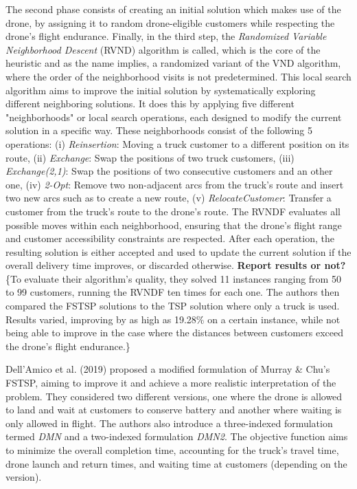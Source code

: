 \documentclass{article}
\begin{document}
	 The second phase consists of creating an initial solution which makes use of the drone, by assigning it to random drone-eligible customers while respecting the drone's flight endurance. Finally, in the third step, the \textit{Randomized Variable Neighborhood Descent} (RVND) algorithm is called, which is the core of the heuristic and as the name implies, a randomized variant of the VND algorithm, where the order of the neighborhood visits is not predetermined. This local search algorithm aims to improve the initial solution by systematically exploring different neighboring solutions. It does this by applying five different "neighborhoods" or local search operations, each designed to modify the current solution in a specific way. These neighborhoods consist of the following 5 operations: (i) \textit{Reinsertion}: Moving a truck customer to a different position on its route, (ii) \textit{Exchange}: Swap the positions of two truck customers, (iii) \textit{Exchange(2,1)}: Swap the positions of two consecutive customers and  an other one, (iv) \textit{2-Opt}: Remove two non-adjacent arcs from the truck's route and insert two new arcs such as to create a new route, (v) \textit{RelocateCustomer}: Transfer a customer from the truck's route to the drone's route. The RVNDF evaluates all possible moves within each neighborhood, ensuring that the drone's flight range and customer accessibility constraints are respected. After each operation, the resulting solution is either accepted and used to update the current solution if the overall delivery time improves, or discarded otherwise. \textbf{Report results or not?} \{To evaluate their algorithm's quality, they solved 11 instances ranging from 50 to 99 customers, running the RVNDF ten times for each one. The authors then compared the FSTSP solutions to the TSP solution where only a truck is used. Results varied, improving by as high as 19.28\% on a certain instance, while not being able to improve in the case where the distances between customers exceed the drone's flight endurance.\}
	\par
	Dell’Amico et al. (2019) \cite{DellAmico2019} proposed a modified formulation of Murray \& Chu's FSTSP, aiming to improve it and achieve a more realistic interpretation of the problem. They considered two different versions, one where the drone is allowed to land and wait at customers to conserve battery and another where waiting is only allowed in flight. The authors also introduce a three-indexed formulation termed \textit{DMN} and a two-indexed formulation \textit{DMN2}. The objective function aims to minimize the overall completion time, accounting for the truck's travel time, drone launch and return times, and waiting time at customers (depending on the version).
\end{document}
